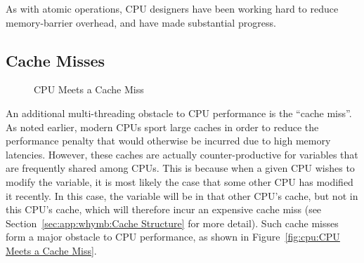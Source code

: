 As with atomic operations, CPU designers have been working hard to
reduce memory-barrier overhead, and have made substantial progress.

\subsection{Cache Misses}
\label{sec:cpu:Cache Misses}

\begin{figure}[tb]
\centering
{}
\caption{CPU Meets a Cache Miss}
\end{figure}

An additional multi-threading obstacle to CPU performance is
the ``cache miss''.
As noted earlier, modern CPUs sport large caches in order to reduce the
performance penalty that would otherwise be incurred due to high memory
latencies.
However, these caches are actually counter-productive for variables that
are frequently shared among CPUs.
This is because when a given CPU wishes to modify the variable, it is
most likely the case that some other CPU has modified it recently.
In this case, the variable will be in that other CPU's cache, but not
in this CPU's cache, which will therefore incur an expensive cache miss
(see Section~\ref{sec:app:whymb:Cache Structure} for more detail).
Such cache misses form a major obstacle to CPU performance, as shown
in Figure~\ref{fig:cpu:CPU Meets a Cache Miss}.

